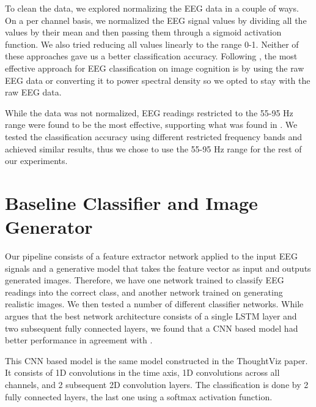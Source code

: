 \documentclass[sigplan,screen]{acmart}
\begin{document}
To clean the data, we explored normalizing the EEG data in a couple of ways. On a per channel basis, we normalized the EEG signal values by dividing all the values by their mean and then passing them through a sigmoid activation function. We also tried reducing all values linearly to the range 0-1. Neither of these approaches gave us a better classification accuracy. Following \cite{Craik_2019}, the most effective approach for EEG classification on image cognition is by using the raw EEG data or converting it to power spectral density so we opted to stay with the raw EEG data.

While the data was not normalized, EEG readings restricted to the 55-95 Hz range were found to be the most effective, supporting what was found in \cite{10.1145/3123266.3127907}. We tested the classification accuracy using different restricted frequency bands and achieved similar results, thus we chose to use the 55-95 Hz range for the rest of our experiments. 

\section{Baseline Classifier and Image Generator}
Our pipeline consists of a feature extractor network applied to the input EEG signals and a generative model that takes the feature vector as input and outputs generated images. Therefore, we have one network trained to classify EEG readings into the correct class, and another network trained on generating realistic images. We then tested a number of different classifier networks. While \cite{10.1145/3240508.3240641} argues that the best network architecture consists of a single LSTM layer and two subsequent fully connected layers, we found that a CNN based model had better performance in agreement with \cite{spampinato2019deep}. 

This CNN based model is the same model constructed in the ThoughtViz \cite{spampinato2019deep} paper. It consists of 1D convolutions in the time axis, 1D convolutions across all channels, and 2 subsequent 2D convolution layers. The classification is done by 2 fully connected layers, the last one using a softmax activation function.
\end{document}
